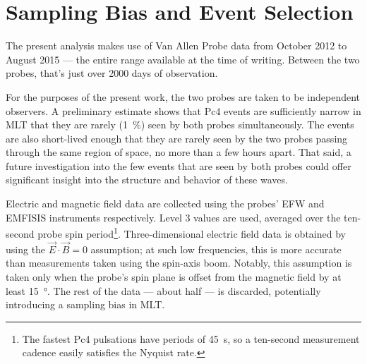 \section{Sampling Bias and Event Selection}
  \label{sec_selection}

The present analysis makes use of Van Allen Probe data from October 2012 to
August 2015 --- the entire range available at the time of writing. Between the
two probes, that's just over 2000 days of observation. 

For the purposes of the present work, the two probes are taken to be
independent observers. A preliminary estimate shows that Pc4 events are
sufficiently narrow in MLT that they are rarely (\about\SI{1}{\percent}) seen
by both probes simultaneously. The events are also short-lived enough that they
are rarely seen by the two probes passing through the same region of space, no
more than a few hours apart. That said, a future investigation into the few
events that are seen by both probes could offer significant insight into the
structure and behavior of these waves. 



Electric and magnetic field data are collected using the probes'
EFW\cite{wygant_2013} and EMFISIS instruments respectively. Level 3 values are
used, averaged over the ten-second probe spin period\footnote{The fastest Pc4
pulsations have periods of \SI{45}{\second}, so a ten-second measurement
cadence easily satisfies the Nyquist rate. }. Three-dimensional
electric field data is obtained by using the $\vec{E} \cdot \vec{B} = 0$
assumption; at such low frequencies, this is more accurate than measurements
taken using the spin-axis boom. Notably, this assumption is taken only when the
probe's spin plane is offset from the magnetic field by at least
\SI{15}{\degree}. The rest of the data --- about half --- is discarded,
potentially introducing a sampling bias in MLT.

